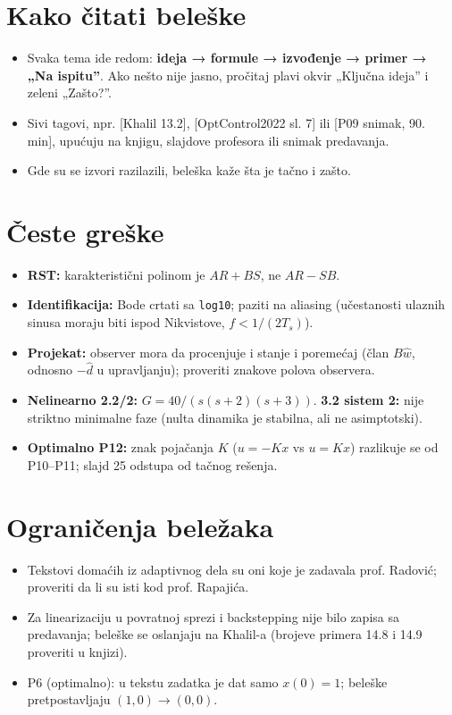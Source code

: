 \documentclass[11pt,a4paper,parskip=half,headsepline,numbers=noenddot]{scrartcl}
\DeclareRobustCommand{\izvor}[1]{{\small\color{izvorC}[#1]}}
\begin{document}
\section{Kako čitati beleške}

\begin{itemize}
\item Svaka tema ide redom: \textbf{ideja → formule → izvođenje → primer → „Na ispitu''}. Ako nešto nije jasno, pročitaj plavi okvir „Ključna ideja'' i zeleni „Zašto?''.
\item Sivi tagovi, npr. \izvor{Khalil 13.2}, \izvor{OptControl2022 sl. 7} ili \izvor{P09 snimak, 90. min}, upućuju na knjigu, slajdove profesora ili snimak predavanja.
\item Gde su se izvori razilazili, beleška kaže šta je tačno i zašto.
\end{itemize}

\section{Česte greške}

\begin{ispit}
\begin{itemize}
\item \textbf{RST:} karakteristični polinom je \(AR + BS\), ne \(AR - SB\).
\item \textbf{Identifikacija:} Bode crtati sa \texttt{log10}; paziti na aliasing (učestanosti ulaznih sinusa moraju biti ispod Nikvistove, \(f < 1/(2T_s)\)).
\item \textbf{Projekat:} observer mora da procenjuje i stanje i poremećaj (član \(B\hat w\), odnosno \(-\hat d\) u upravljanju); proveriti znakove polova observera.
\item \textbf{Nelinearno 2.2/2:} \(G = 40/(s(s+2)(s+3))\). \textbf{3.2 sistem 2:} nije striktno minimalne faze (nulta dinamika je stabilna, ali ne asimptotski).
\item \textbf{Optimalno P12:} znak pojačanja \(K\) (\(u=-Kx\) vs \(u=Kx\)) razlikuje se od P10--P11; slajd 25 odstupa od tačnog rešenja.
\end{itemize}
\end{ispit}

\section{Ograničenja beležaka}

\begin{itemize}
\item Tekstovi domaćih iz adaptivnog dela su oni koje je zadavala prof. Radović; proveriti da li su isti kod prof. Rapajića.
\item Za linearizaciju u povratnoj sprezi i backstepping nije bilo zapisa sa predavanja; beleške se oslanjaju na Khalil-a (brojeve primera 14.8 i 14.9 proveriti u knjizi).
\item P6 (optimalno): u tekstu zadatka je dat samo \(x(0)=1\); beleške pretpostavljaju \((1,0)\to(0,0)\).
\end{itemize}
\end{document}
